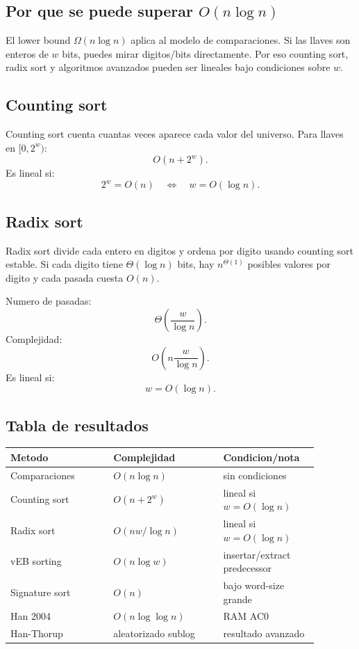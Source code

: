 \documentclass[10pt]{article}
\newcommand{\bigO}{O}
\begin{document}
\subsection{Por que se puede superar $\bigO(n\log n)$}
El lower bound $\Omega(n\log n)$ aplica al modelo de comparaciones. Si las llaves
son enteros de $w$ bits, puedes mirar digitos/bits directamente. Por eso
counting sort, radix sort y algoritmos avanzados pueden ser lineales bajo
condiciones sobre $w$.

\subsection{Counting sort}
Counting sort cuenta cuantas veces aparece cada valor del universo. Para llaves
en $[0,2^w)$:
\[
\bigO(n+2^w).
\]
Es lineal si:
\[
2^w=\bigO(n)\quad\Longleftrightarrow\quad w=\bigO(\log n).
\]

\subsection{Radix sort}
Radix sort divide cada entero en digitos y ordena por digito usando counting
sort estable. Si cada digito tiene $\Theta(\log n)$ bits, hay $n^{\Theta(1)}$
posibles valores por digito y cada pasada cuesta $\bigO(n)$.

Numero de pasadas:
\[
\Theta\left(\frac{w}{\log n}\right).
\]
Complejidad:
\[
\bigO\left(n\frac{w}{\log n}\right).
\]
Es lineal si:
\[
w=\bigO(\log n).
\]

\subsection{Tabla de resultados}
\begin{center}
\begin{tabular}{p{0.30\linewidth}p{0.32\linewidth}p{0.26\linewidth}}
\toprule
Metodo & Complejidad & Condicion/nota \\
\midrule
Comparaciones & $\bigO(n\log n)$ & sin condiciones \\
Counting sort & $\bigO(n+2^w)$ & lineal si $w=\bigO(\log n)$ \\
Radix sort & $\bigO(nw/\log n)$ & lineal si $w=\bigO(\log n)$ \\
vEB sorting & $\bigO(n\log w)$ & insertar/extract predecessor \\
Signature sort & $\bigO(n)$ & bajo word-size grande \\
Han 2004 & $\bigO(n\log\log n)$ & RAM AC0 \\
Han-Thorup & aleatorizado sublog & resultado avanzado \\
\bottomrule
\end{tabular}
\end{center}
\end{document}
